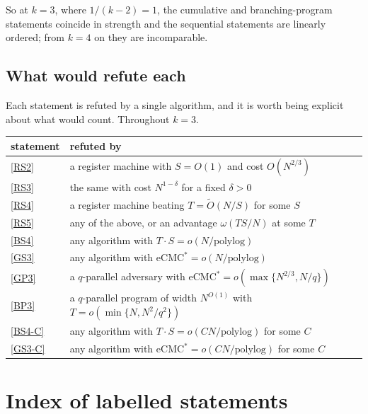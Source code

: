 \documentclass[11pt]{article}
\theoremstyle{plain}
\theoremstyle{definition}
\newcommand{\eCMCs}{\mathrm{eCMC}^{*}}
\begin{document}
So at $k=3$, where $1/(k-2)=1$, the cumulative and branching-program
statements coincide in strength and the sequential statements are linearly
ordered; from $k=4$ on they are incomparable.


\subsection{What would refute each}


Each statement is refuted by a single algorithm, and it is worth being
explicit about what would count.  Throughout $k=3$.

\begin{center}
\small
\begin{tabular}{@{}ll@{}}
\toprule
statement & refuted by \\
\midrule
\ref{RS2} & a register machine with $S = O(1)$ and cost $O(N^{2/3})$ \\
\ref{RS3} & the same with cost $N^{1-\delta}$ for a fixed $\delta > 0$ \\
\ref{RS4} & a register machine beating $T = \tilde O(N/S)$ for some $S$ \\
\ref{RS5} & any of the above, or an advantage $\omega(TS/N)$ at some $T$ \\
\ref{BS4} & any algorithm with $T \cdot S = o(N/\mathrm{polylog})$ \\
\ref{GS3} & any algorithm with $\eCMCs = o(N/\mathrm{polylog})$ \\
\ref{GP3} & a $q$-parallel adversary with $\eCMCs = o(\max\{N^{2/3},N/q\})$ \\
\ref{BP3} & a $q$-parallel program of width $N^{O(1)}$ with
            $T = o(\min\{N,N^{2}/q^{2}\})$ \\
\ref{BS4-C} & any algorithm with $T \cdot S = o(CN/\mathrm{polylog})$ for some $C$ \\
\ref{GS3-C} & any algorithm with $\eCMCs = o(CN/\mathrm{polylog})$ for some $C$ \\
\bottomrule
\end{tabular}
\end{center}
\section{Index of labelled statements}\label{sec:index}
\end{document}
